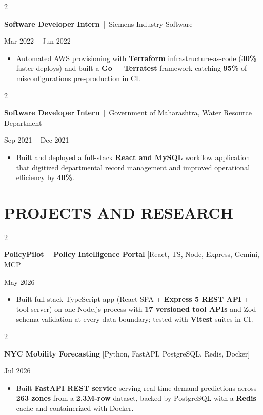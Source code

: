 \documentclass[10pt, letterpaper]{article}
\newenvironment{highlights}{
    \begin{itemize}[
        topsep=0.10 cm,
        parsep=0.06 cm,
        partopsep=0pt,
        itemsep=0.06 cm,
        leftmargin=12pt
    ]
}{
    \end{itemize}
}
\newenvironment{twocolentry}[2][]{
    \onecolentry
    \def\secondColumn{#2}
    \setcolumnwidth{\fill, 4.5 cm}
    \begin{paracol}{2}
}{
    \switchcolumn \raggedleft \secondColumn
    \end{paracol}
    \endonecolentry
}
\begin{document}
\vspace{0.10 cm}

\begin{twocolentry}{Mar 2022 -- Jun 2022}
\textbf{Software Developer Intern} \,|\, Siemens Industry Software
\end{twocolentry}
\begin{highlights}
  \item Automated AWS provisioning with \textbf{Terraform} infrastructure-as-code (\textbf{30\%} faster deploys) and built a \textbf{Go + Terratest} framework catching \textbf{95\%} of misconfigurations pre-production in CI.
\end{highlights}

\vspace{0.10 cm}

\begin{twocolentry}{Sep 2021 -- Dec 2021}
\textbf{Software Developer Intern} \,|\, Government of Maharashtra, Water Resource Department
\end{twocolentry}
\begin{highlights}
  \item Built and deployed a full-stack \textbf{React and MySQL} workflow application that digitized departmental record management and improved operational efficiency by \textbf{40\%}.
\end{highlights}

\section{PROJECTS AND RESEARCH}
\begin{twocolentry}{May 2026}
\textbf{PolicyPilot -- Policy Intelligence Portal} [React, TS, Node, Express, Gemini, MCP]
\end{twocolentry}
\begin{highlights}
  \item Built full-stack TypeScript app (React SPA + \textbf{Express 5 REST API} + tool server) on one Node.js process with \textbf{17 versioned tool APIs} and Zod schema validation at every data boundary; tested with \textbf{Vitest} suites in CI.
\end{highlights}

\vspace{0.10 cm}

\begin{twocolentry}{Jul 2026}
\textbf{NYC Mobility Forecasting} [Python, FastAPI, PostgreSQL, Redis, Docker]
\end{twocolentry}
\begin{highlights}
  \item Built \textbf{FastAPI REST service} serving real-time demand predictions across \textbf{263 zones} from a \textbf{2.3M-row} dataset, backed by PostgreSQL with a \textbf{Redis} cache and containerized with Docker.
\end{highlights}
\end{document}
